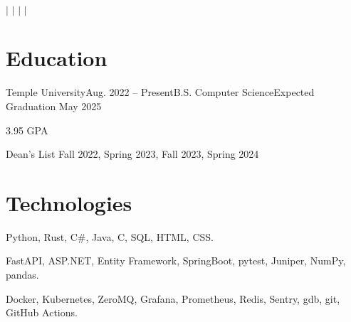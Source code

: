 \documentclass[letterpaper,11pt]{article}
\begin{document}
{\Huge \myname}
\\
\vspace{2pt}

\small{
    \faEnvelope
    \thinspace \thinspace
    \myemail
    \thinspace \thinspace $|$
    \faGithub
    \thinspace \thinspace
    \mygh
    \thinspace \thinspace $|$
    \faLinkedin
    \thinspace \thinspace
    \mylinkedin
    \thinspace \thinspace $|$
    \faPhone
    \thinspace \thinspace
    \myphone
    \thinspace \thinspace $|$
    \thinspace \thinspace
    \mylocation
}

\vspace{-7pt}

\section{Education}
\begin{entries}
    \item\begin{experience}{Temple University}{Aug. 2022 -- Present}{B.S. Computer Science}{Expected Graduation May 2025}
        \item 3.95 GPA
        \item Dean's List Fall 2022, Spring 2023, Fall 2023, Spring 2024
    \end{experience}
\end{entries}

\section{Technologies}
\begin{description}[nosep, labelindent=0.15in]
    \item[Programming Languages:]
        Python,
        Rust,
        C\#,
        Java,
        C,
        SQL,
        HTML,
        CSS.
    \item[Libraries:]
        FastAPI,
        ASP.NET,
        Entity Framework,
        SpringBoot,
        pytest,
        Juniper,
        NumPy,
        pandas.
    \item[Tools:]
        Docker,
        Kubernetes,
        ZeroMQ,
        Grafana,
        Prometheus,
        Redis,
        Sentry,
        gdb,
        git,
        GitHub Actions.
\end{description}
\end{document}
